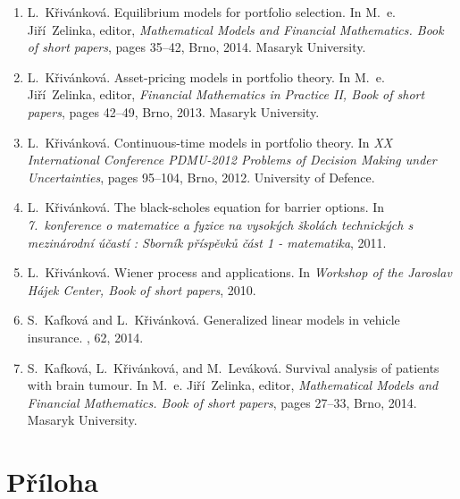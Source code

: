 \documentclass[a4paper,12pt]{report}
\theoremstyle{definition} \newtheorem{definice}[veta]{Definice}
\theoremstyle{remark}
\begin{document}
\begin{enumerate}
\renewcommand\labelenumi{\Roman{enumi}.}
\item
L.~Křivánková.
\newblock Equilibrium models for portfolio selection.
\newblock In M.~e. Jiří~Zelinka, editor, {\em Mathematical Models and
  Financial Mathematics. Book of short papers}, pages 35--42, Brno, 2014.
  Masaryk University.

\item
L.~Křivánková.
\newblock Asset-pricing models in portfolio theory.
\newblock In M.~e. Jiří~Zelinka, editor, {\em Financial Mathematics in
  Practice II, Book of short papers}, pages 42--49, Brno, 2013. Masaryk
  University.

\item
L.~Křivánková.
\newblock Continuous-time models in portfolio theory.
\newblock In {\em XX International Conference PDMU-2012 Problems of Decision
  Making under Uncertainties}, pages 95--104, Brno, 2012. University of
  Defence.

\item
L.~Křivánková.
\newblock The black-scholes equation for barrier options.
\newblock In {\em 7.~konference o matematice a fyzice na vysokých školách
  technických s mezinárodní účastí : Sborník příspěvků část 1 -
  matematika}, 2011.

\item
L.~Křivánková.
\newblock Wiener process and applications.
\newblock In {\em Workshop of the Jaroslav Hájek Center, Book of short
  papers}, 2010.

\item
S.~Kafková and L.~Křivánková.
\newblock Generalized linear models in vehicle insurance.
, 62, 2014.

\item
S.~Kafková, L.~Křivánková, and M.~Leváková.
\newblock Survival analysis of patients with brain tumour.
\newblock In M.~e. Jiří~Zelinka, editor, {\em Mathematical Models and
  Financial Mathematics. Book of short papers}, pages 27--33, Brno, 2014.
  Masaryk University.

\end{enumerate}


\chapter[Příloha -- Ukázka datového souboru]{Příloha}
\end{document}
